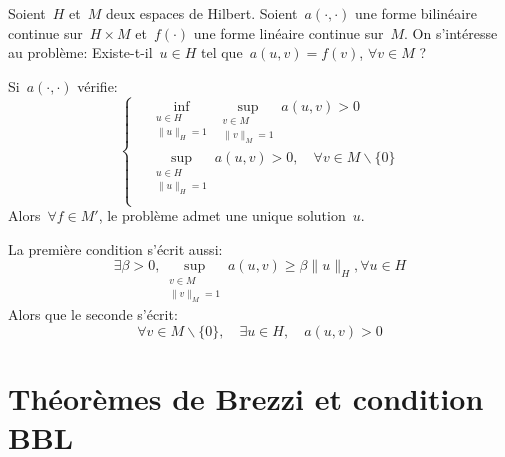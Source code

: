 \begin{theoreme}
Soient~$H$ et~$M$ deux espaces de Hilbert.
Soient~$a(\cdot,\cdot)$ une forme bilinéaire continue sur~$H \times M$ et~$f(\cdot)$ une forme linéaire continue sur~$M$.
On s'intéresse au problème: Existe-t-il~$u\in H$ tel que~$a(u,v)=f(v)$, $\forall v\in M$ ?

Si~$a(\cdot,\cdot)$ vérifie:
\begin{equation}\left\{
\begin{aligned}
&\displaystyle\inf_{\substack{u\in H\\\|u\|_H=1}} \sup_{\substack{v\in M\\\|v\|_M=1}} a(u,v) > 0\\[+2mm]
&\displaystyle\sup_{\substack{u\in H\\\|u\|_H=1}} a(u,v) > 0, \quad\forall v\in M\backslash\{0\}\\
\end{aligned}\right.
\end{equation}
Alors~$\forall f\in M'$, le problème admet une unique solution~$u$.
\end{theoreme}

\medskip
La première condition s'écrit aussi:
\begin{equation}
\exists \beta > 0, \sup_{\substack{v\in M\\\|v\|_M=1}} a(u,v) \ge \beta \|u\|_H, \forall u\in H
\end{equation}
Alors que le seconde s'écrit:
\begin{equation}
\forall v\in M\backslash\{0\},\quad \exists u\in H,\quad a(u,v)>0
\end{equation}


\medskip
{}


\section{Théorèmes de Brezzi et condition BBL}\label{Sec-ThBrezzi}

